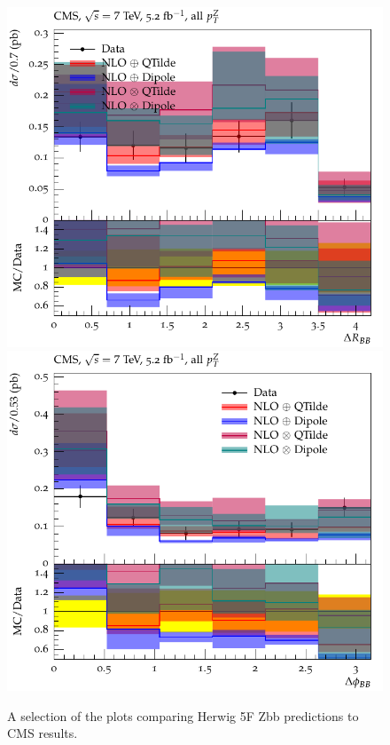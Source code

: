 \documentclass[11pt]{cernrep} \usepackage{graphicx,epsfig} 
\begin{document}
\begin{figure}[htbp]
   \includegraphics[scale=0.65]{figs/zbb/herwigzbb/d01-x01-y01.pdf} 
   \includegraphics[scale=0.65]{figs/zbb/herwigzbb/d02-x01-y01.pdf} 
\caption{A selection of the plots comparing Herwig 5F Zbb predictions to CMS results.}
\label{zbb-herwigzbb-cms}
\end{figure}
\end{document}
